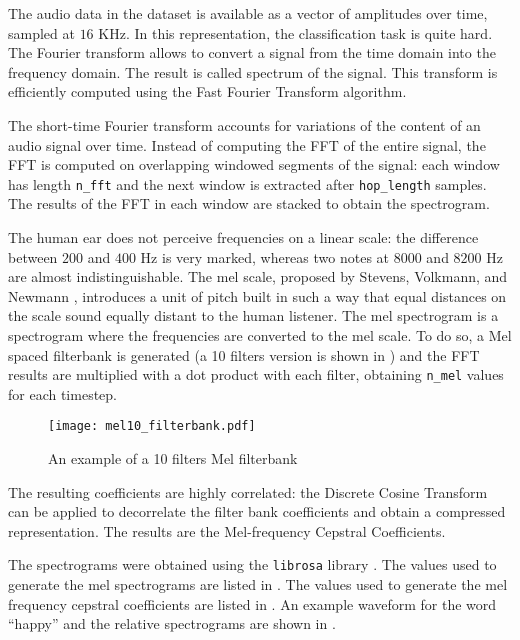 The audio data in the dataset is available as a vector of amplitudes over time,
sampled at $16$ KHz. In this representation, the classification task is quite
hard.
The Fourier transform allows to convert a signal from the time domain into the
frequency domain. The result is called spectrum of the signal. This transform
is efficiently computed using the Fast Fourier Transform algorithm.

The short-time Fourier transform accounts for variations of the content of an
audio signal over time. Instead of computing the FFT of the entire signal, the
FFT is computed on overlapping windowed segments of the signal: each window has
length \texttt{n\_fft} and the next window is extracted after
\texttt{hop\_length} samples.
The results of the FFT in each window are stacked to obtain the spectrogram.

The human ear does not perceive frequencies on a linear scale: the difference
between $200$ and $400$ Hz is very marked, whereas two notes at $8000$ and
$8200$ Hz are almost indistinguishable. The mel scale, proposed by Stevens,
Volkmann, and Newmann \cite{melscale1937}, introduces a unit of pitch built in
such a way that equal distances on the scale sound equally distant to the human
listener.
The mel spectrogram is a spectrogram where the frequencies are converted to the
mel scale. To do so, a Mel spaced filterbank is generated (a 10 filters version
is shown in ) and the FFT results are multiplied with
a dot product with each filter, obtaining \texttt{n\_mel} values for each
timestep.

\begin{figure}[t!]
    \centering
    \texttt{[image: mel10\_filterbank.pdf]}
    \caption{An example of a 10 filters Mel filterbank}
    \label{fig:mel10_filterbank}
\end{figure}

The resulting coefficients are highly correlated: the Discrete Cosine Transform
can be applied to decorrelate the filter bank coefficients and obtain a
compressed representation.
The results are the Mel-frequency Cepstral Coefficients.

The spectrograms were obtained using the \texttt{librosa} library
\cite{brian_mcfee_2020_3955228}.
The values used to generate the mel spectrograms are listed in
.
The values used to generate the mel frequency cepstral coefficients are listed
in .
An example waveform for the word ``happy'' and the relative spectrograms are
shown in .


